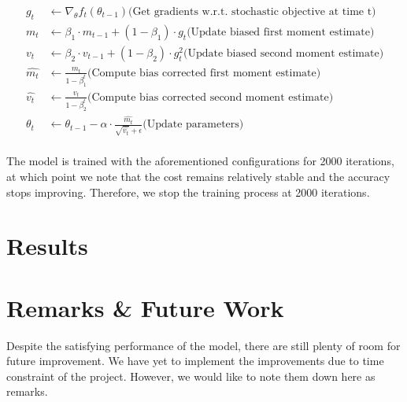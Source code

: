 \documentclass[12pt]{extarticle}
\begin{document}
\begin{equation*}
  \begin{split}
    g_t &\leftarrow \nabla_{\theta} f_t (\theta_{t-1}) \text{(Get gradients w.r.t. stochastic objective at time t)} \\
    m_t &\leftarrow \beta_1 \cdot m_{t-1} + (1-\beta_1) \cdot g_t \text{(Update biased first moment estimate)} \\
    v_t &\leftarrow \beta_2 \cdot v_{t-1} + (1-\beta_2) \cdot g_t^2 \text{(Update biased second moment estimate)} \\
    \hat{m_{t}} &\leftarrow \frac{m_t}{1 - \beta_1^t} \text{(Compute bias corrected first moment estimate)} \\
    \hat{v_{t}} &\leftarrow \frac{v_t}{1 - \beta_2^t} \text{(Compute bias corrected second moment estimate)} \\
    \theta_t &\leftarrow \theta_{t-1} - \alpha \cdot \frac{\hat{m_t}}{\sqrt{\hat{v_t}} + \epsilon} \text{(Update parameters)}
  \end{split}
\end{equation*}
\\




\noindent The model is trained with the aforementioned configurations for 2000 iterations,
at which point we note that the cost remains relatively stable and the accuracy stops
improving. Therefore, we stop the training process at 2000 iterations.

\section{Results} \label{results}


\section{Remarks \& Future Work}
Despite the satisfying performance of the model, there are still plenty of room
for future improvement. We have yet to implement the improvements due to time constraint
of the project. However, we would like to note them down here as remarks.
\end{document}
